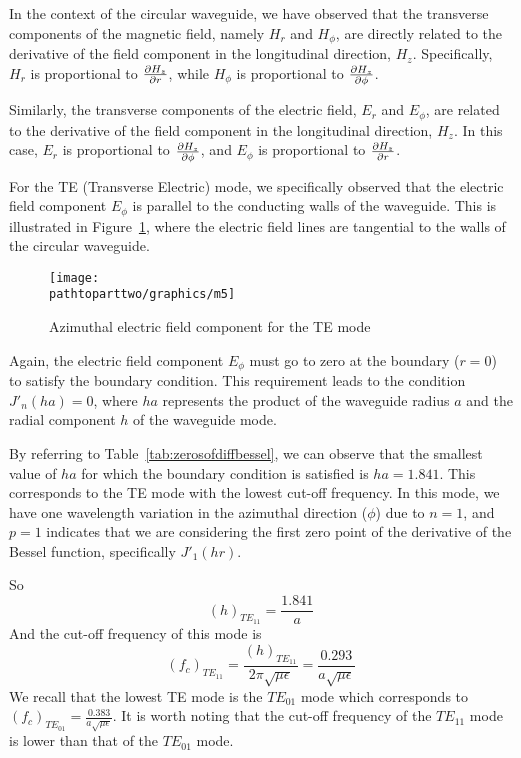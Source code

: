In the context of the circular waveguide, we have observed that the transverse components of the magnetic field, namely $H_r$ and $H_\phi$, are directly related to the derivative of the field component in the longitudinal direction, $H_z$. Specifically, $H_r$ is proportional to $\partialderivative{H_z}{r}$, while $H_\phi$ is proportional to $\partialderivative{H_z}{\phi}$.

Similarly, the transverse components of the electric field, $E_r$ and $E_\phi$, are related to the derivative of the field component in the longitudinal direction, $H_z$. In this case, $E_r$ is proportional to $\partialderivative{H_z}{\phi}$, and $E_\phi$ is proportional to $\partialderivative{H_z}{r}$.

For the TE (Transverse Electric) mode, we specifically observed that the electric field component $E_\phi$ is parallel to the conducting walls of the waveguide. This is illustrated in Figure~\ref{fig:m5}, where the electric field lines are tangential to the walls of the circular waveguide.
\begin{figure}[h]
\centering
\texttt{[image: \\pathtoparttwo/graphics/m5]}
\caption{Azimuthal electric field component for the TE mode}
\label{fig:m5}
\end{figure}

Again, the electric field component $E_\phi$ must go to zero at the boundary ($r=0$) to satisfy the boundary condition. This requirement leads to the condition $J'_n(ha) = 0$, where $ha$ represents the product of the waveguide radius $a$ and the radial component $h$ of the waveguide mode.

By referring to Table~\ref{tab:zerosofdiffbessel}, we can observe that the smallest value of $ha$ for which the boundary condition is satisfied is $ha = 1.841$. This corresponds to the TE mode with the lowest cut-off frequency. In this mode, we have one wavelength variation in the azimuthal direction ($\phi$) due to $n=1$, and $p=1$ indicates that we are considering the first zero point of the derivative of the Bessel function, specifically $J'_1(hr)$.

So
$$
(h)_{TE_{11}} = \frac{1.841}{a}
$$
And the cut-off frequency of this mode is 
$$
(f_c)_{TE_{11}} = \frac{(h)_{TE_{11}}}{2\pi\sqrt{\mu\epsilon}} = \frac{0.293}{a\sqrt{\mu\epsilon}}
$$
We recall that the lowest TE mode is the $TE_{01}$ mode which corresponds to $(f_c)_{TE_{01}} = \frac{0.383}{a\sqrt{\mu\epsilon}}$. It is worth noting that the cut-off frequency of the $TE_{11}$ mode is lower than that of the $TE_{01}$ mode.

